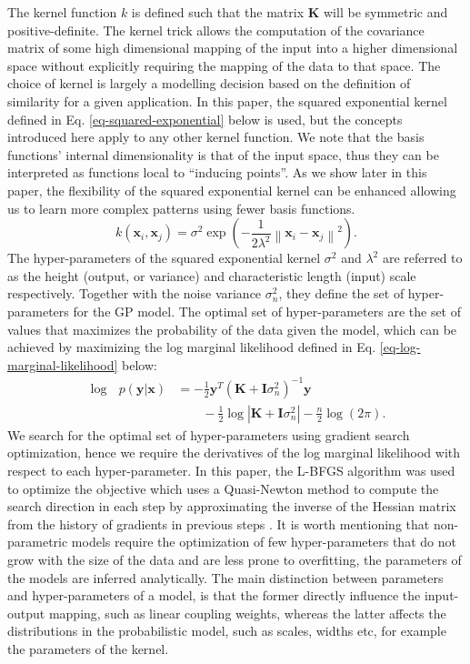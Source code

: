 \documentclass[useAMS,usenatbib,fleqn]{mn2e}
\begin{document}
The kernel function $k$ is defined such that the matrix $\mathbf{K}$ will be symmetric and positive-definite. The kernel trick allows the computation of the covariance matrix of some high dimensional mapping of the input into a higher dimensional space without explicitly requiring the mapping of the data to that space. The choice of kernel is largely a modelling decision based on the definition of similarity for a given application. In this paper, the squared exponential kernel defined in  Eq. \eqref{eq-squared-exponential} below is used, but the concepts introduced here apply to any other kernel function. We note that the basis functions' internal dimensionality is that of the input space, thus they can be interpreted as functions local to ``inducing points''. As we show later in this paper, the flexibility of the squared exponential kernel can be enhanced allowing us to learn more complex patterns using fewer basis functions.
\begin{equation}
\label{eq-squared-exponential}
k(\mathbf{x}_{i},\mathbf{x}_{j}) = \sigma^{2} \exp \left ( -\frac{1} {2\lambda^{2}} \left \|\mathbf{x}_{i}-\mathbf{x}_{j}\right\|^{2}\right ).
\end{equation}
The hyper-parameters of the squared exponential kernel $\sigma^{2}$ and $\lambda^{2}$ are referred to as the height (output, or variance) and characteristic length (input) scale respectively. Together with the noise variance $\sigma_{n}^{2}$, they define the set of hyper-parameters for the GP model. The optimal set of hyper-parameters are the set of values that maximizes the probability of the data given the model, which can be achieved by maximizing the log marginal likelihood \citep{rasmussen2006gaussian} defined in Eq. \eqref{eq-log-marginal-likelihood} below:
\begin{align}
\label{eq-log-marginal-likelihood}
\log\text{ }p(\mathbf{y}|\mathbf{x}) &= -\frac{1}{2}\mathbf{y}^{T}\left(\mathbf{K}+\mathbf{I}\sigma_{n}^{2} \right)^{-1}\mathbf{y} \nonumber \\
&\qquad -\frac{1}{2} \log\left | \mathbf{K}+\mathbf{I}\sigma_{n}^{2}\right|-\frac{n}{2}\log(2\pi).
\end{align}
We search for the optimal set of hyper-parameters using gradient search optimization, hence we require the derivatives of the log marginal likelihood with respect to each hyper-parameter. In this paper, the L-BFGS algorithm was used to optimize the objective which uses a Quasi-Newton method to compute the search direction in each step by approximating the inverse of the Hessian matrix from the history of gradients in previous steps \citep{jorge1980,schmidt2005}. It is worth mentioning that non-parametric models require the optimization of few hyper-parameters that do not grow with the size of the data and are less prone to overfitting, the parameters of the models are inferred analytically. The main distinction between parameters and hyper-parameters of a model, is that the former directly influence the input-output mapping, such as linear coupling weights, whereas the latter affects the distributions in the probabilistic model, such as scales, widths etc, for example the parameters of the kernel.
\end{document}
